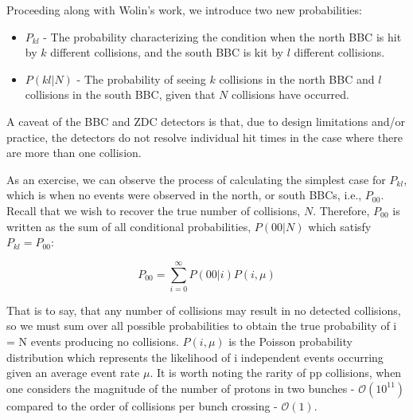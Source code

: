 Proceeding along with Wolin's work, we introduce two new probabilities:

\begin{itemize}
  \item $P_{kl}$ - The probability characterizing the condition when the north
    BBC is hit by $k$ different collisions, and the south BBC is kit by $l$
    different collisions.
  \item $P(kl\vert N)$ - The probability of seeing $k$ collisions in the
    north BBC and $l$ collisions in the south BBC, given that $N$ collisions
    have occurred.
\end{itemize}

A caveat of the BBC and ZDC detectors is that, due to design limitations and/or
practice, the detectors do not resolve individual hit times in the case where
there are more than one collision.

As an exercise, we can observe the process of calculating the simplest case for
$P_{kl}$, which is when no events were observed in the north, or south BBCs,
i.e., $P_{00}$. Recall that we wish to recover the true number of collisions,
$N$. Therefore, $P_{00}$ is written as the sum of all conditional
probabilities, $P(00|N)$ which satisfy $P_{kl} = P_{00}$:

\begin{equation}
  P_{00} = \sum_{i=0}^{\infty} P(00\vert i)P(i,\mu)
  \label{eq:p_simple}
\end{equation}

That is to say, that any number of collisions may result in no detected
collisions, so we must sum over all possible probabilities to obtain the true
probability of i = N events producing no collisions. $P(i,\mu)$ is the Poisson
probability distribution which represents the likelihood of i independent events
occurring given an average event rate $\mu$. It is worth noting the rarity of pp
collisions, when one considers the magnitude of the number of protons in two
bunches - $\mathcal{O}(10^{11})$ compared to the order of collisions per bunch
crossing - $\mathcal{O}(1)$.

\edithere{}
